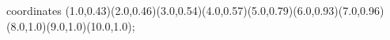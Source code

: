 					coordinates { (1.0,0.43)(2.0,0.46)(3.0,0.54)(4.0,0.57)(5.0,0.79)(6.0,0.93)(7.0,0.96)(8.0,1.0)(9.0,1.0)(10.0,1.0)};